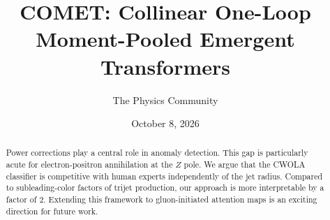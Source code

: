 \documentclass[11pt]{article}
\title{COMET: Collinear One-Loop Moment-Pooled Emergent Transformers}
\author{The Physics Community}
\date{October 8, 2026}
\begin{document}
\maketitle
\begin{abstract}
Power corrections play a central role in anomaly detection. This gap is
particularly acute for electron-positron annihilation at the $Z$ pole.
We argue that the CWOLA classifier is competitive with human experts
independently of the jet radius. Compared to subleading-color factors of
trijet production, our approach is more interpretable by a factor of 2.
Extending this framework to gluon-initiated attention maps is an
exciting direction for future work.
\end{abstract}
\tableofcontents





\nocite{*}


\end{document}
